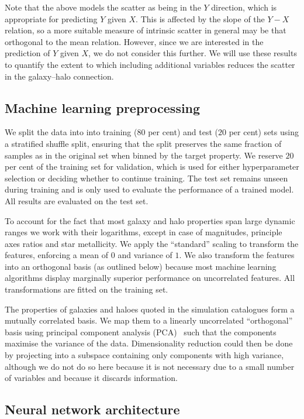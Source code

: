\documentclass[useAMS,usenatbib]{mnras}
\begin{document}
Note that the above models the scatter as being in the $Y$ direction, which is appropriate for predicting $Y$ given $X$. This is affected by the slope of the $Y-X$ relation, so a more suitable measure of intrinsic scatter in general may be that orthogonal to the mean relation. However, since we are interested in the prediction of $Y$ given $X$, we do not consider this further. We will use these results to quantify the extent to which including additional variables reduces the scatter in the galaxy--halo connection.


\subsection{Machine learning preprocessing}\label{sec:preprocess}

We split the data into into training ($80$ per cent) and test ($20$ per cent) sets using a stratified shuffle split, ensuring that the split preserves the same fraction of samples as in the original set when binned by the target property. We reserve $20$ per cent of the training set for validation, which is used for either hyperparameter selection or deciding whether to continue training. The test set remains unseen during training and is only used to evaluate the performance of a trained model. All results are evaluated on the test set.

To account for the fact that most galaxy and halo properties span large dynamic ranges we work with their logarithms, except in case of magnitudes, principle axes ratios and star metallicity. We apply the ``standard'' scaling to transform the features, enforcing a mean of $0$ and variance of $1$. We also transform the features into an orthogonal basis (as outlined below) because most machine learning algorithms display marginally superior performance on uncorrelated features. All transformations are fitted on the training set.

The properties of galaxies and haloes quoted in the simulation catalogues form a mutually correlated basis. We map them to a linearly uncorrelated ``orthogonal'' basis using principal component analysis (PCA)~\citep{pearson_PCA,hotelling_PCA} such that the components maximise the variance of the data. Dimensionality reduction could then be done by projecting into a subspace containing only components with high variance, although we do not do so here because it is not necessary due to a small number of variables and because it discards information.

\subsection{Neural network architecture}\label{sec:NNarchitecture}
\end{document}
